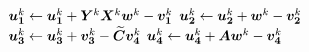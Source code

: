 \begin{figure}
{\begin{minipage}{0.999\textwidth}
\begin{algorithm}[H]
\begin{algorithmic}[1]
\begin{spacing}{1.09}
{		\vspace{4pt}
		\vspace{1.75pt}
			\State\HSPACE $\uak \leftarrow \uak + \Yk\Xk\wk-\vak$\vspace{1.75pt}
			\State\HSPACE $\ubk \leftarrow \ubk + \wk - \vbk$\vspace{1.75pt}
			\State\HSPACE $\uck \leftarrow \uck + \vck - \Ctil\vdk$\vspace{1.75pt}
			\State\HSPACE $\udk \leftarrow \udk + \A\wk - \vdk$\vspace{1.75pt}
		\EndFor\vspace{0pt}
}
\vspace{-0.045\linewidth}\end{spacing}
\end{algorithmic}
\end{algorithm}
\end{minipage}}
\vspace{-22pt}
\end{figure}
